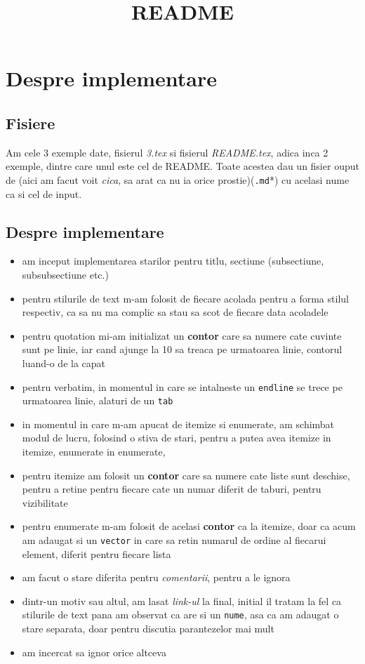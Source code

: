 \title{README}

\section{Despre implementare}

\subsection{Fisiere}
Am cele 3 exemple date, fisierul \emph{3.tex} si fisierul \emph{README.tex}, adica inca 2 exemple, dintre care unul este cel de README.
Toate acestea dau un fisier ouput de  (aici am facut voit \textit{cica}, sa arat ca nu ia orice prostie)(\texttt{.md}*) cu acelasi nume ca si cel de input.

\subsection{Despre implementare}
\begin{itemize}
    \item am inceput implementarea starilor pentru titlu, sectiune (subsectiune, subsubsectiune etc.)
    \item pentru stilurile de text m-am folosit de fiecare acolada pentru a forma stilul respectiv, ca sa nu ma complic sa stau sa scot de fiecare data acoladele
    \item pentru quotation mi-am initializat un \textbf{contor} care sa numere cate cuvinte sunt pe linie, iar cand ajunge la 10 sa treaca pe urmatoarea linie, contorul luand-o de la capat
    \item pentru verbatim, in momentul in care se intalneste un \texttt{endline} se trece pe urmatoarea linie, alaturi de un \texttt{tab}
    \item in momentul in care m-am apucat de itemize si enumerate, am schimbat modul de lucru, folosind o stiva de stari, pentru a putea avea itemize in itemize, enumerate in enumerate,
    \item pentru itemize am folosit un \textbf{contor} care sa numere cate liste sunt deschise, pentru a retine pentru fiecare cate un numar diferit de taburi, pentru vizibilitate
    \item pentru enumerate m-am folosit de acelasi \textbf{contor} ca la itemize, doar ca acum am adaugat si un \texttt{vector} in care sa retin numarul de ordine al fiecarui element, diferit pentru fiecare lista
    \item am facut o stare diferita pentru \textit{comentarii}, pentru a le ignora
    \item dintr-un motiv sau altul, am lasat \emph{link-ul} la final, initial il tratam la fel ca stilurile de text pana am observat ca are si un \texttt{nume}, asa ca am adaugat o stare separata, doar pentru discutia parantezelor mai mult
    \item am incercat sa ignor orice altceva
\end{itemize}


